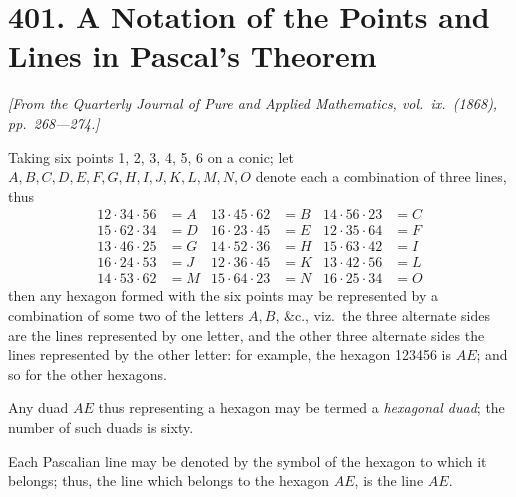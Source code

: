 \documentclass[11pt,a4paper]{article}
\theoremstyle{definition}
\begin{document}
\newpage


\section*{401. A Notation of the Points and Lines in Pascal's Theorem}

\begin{flushright}
\textit{[From the Quarterly Journal of Pure and Applied Mathematics, vol.\ ix.\ (1868), pp.~268---274.]}
\end{flushright}

\vspace{0.5em}

Taking six points 1, 2, 3, 4, 5, 6 on a conic; let $A, B, C, D, E, F, G, H, I, J, K, L, M, N, O$ denote each a combination of three lines, thus
\begin{align*}
12 \cdot 34 \cdot 56 &= A & 13 \cdot 45 \cdot 62 &= B & 14 \cdot 56 \cdot 23 &= C\\
15 \cdot 62 \cdot 34 &= D & 16 \cdot 23 \cdot 45 &= E & 12 \cdot 35 \cdot 64 &= F\\
13 \cdot 46 \cdot 25 &= G & 14 \cdot 52 \cdot 36 &= H & 15 \cdot 63 \cdot 42 &= I\\
16 \cdot 24 \cdot 53 &= J & 12 \cdot 36 \cdot 45 &= K & 13 \cdot 42 \cdot 56 &= L\\
14 \cdot 53 \cdot 62 &= M & 15 \cdot 64 \cdot 23 &= N & 16 \cdot 25 \cdot 34 &= O
\end{align*}
then any hexagon formed with the six points may be represented by a combination of some two of the letters $A, B$, \&c., viz.\ the three alternate sides are the lines represented by one letter, and the other three alternate sides the lines represented by the other letter: for example, the hexagon 123456 is $AE$; and so for the other hexagons.

Any duad $AE$ thus representing a hexagon may be termed a \textit{hexagonal duad}; the number of such duads is sixty.

Each Pascalian line may be denoted by the symbol of the hexagon to which it belongs; thus, the line which belongs to the hexagon $AE$, is the line $AE$.
\end{document}
